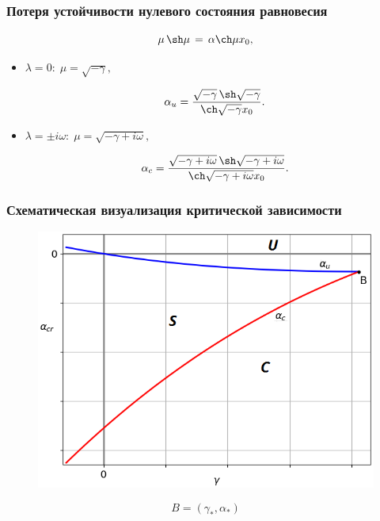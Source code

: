 \documentclass[fullscreen=true, unicode, bookmarks=false]{beamer}
\begin{document}
\begin{frame}
\frametitle{ Потеря устойчивости нулевого состояния равновесия }
 
\begin{equation}
	\mu \, \sh \mu \, = \, \alpha \ch \mu x_0,
\end{equation}

\medskip

\begin{itemize}

\item { $ \lambda = 0: \; \mu = \sqrt{-\gamma}, $ 
}

$$ \alpha_u = \frac{ \sqrt{-\gamma} \, \sh \sqrt{-\gamma} }{ \ch \sqrt{-\gamma} x_0 }. $$

\item { $ \lambda = \pm i \omega: \; \mu = \sqrt{-\gamma + i \omega}, $ 
}

$$ \alpha_c = \frac{ \sqrt{-\gamma + i \omega} \, \sh \sqrt{-\gamma + i \omega} }{ \ch \sqrt{-\gamma + i \omega} x_0 }. $$

\end{itemize}	

\end{frame}

\begin{frame}
\frametitle{ Схематическая визуализация критической зависимости }

\begin{figure} 
\includegraphics[scale=0.55]{scheme.png}  
\end{figure}

$$ B=(\gamma_*, \alpha_*) $$

\end{frame}
\end{document}

